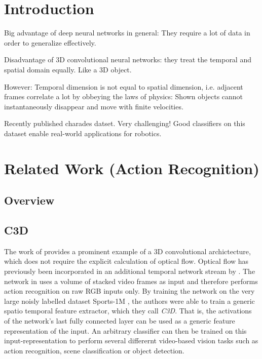 \section{Introduction}

Big advantage of deep neural networks in general: They require a lot of data in order to generalize effectively.

Disadvantage of 3D convolutional neural networks: they treat the temporal and spatial domain equally.
Like a 3D object.

However: Temporal dimension is not equal to spatial dimension, i.e. adjacent frames correlate a lot by obbeying the laws of physics: Shown objects cannot instantaneously disappear and move with finite velocities.

Recently published charades datset. Very challenging!
Good classifiers on this dataset enable real-world applications for robotics.

\section{Related Work (Action Recognition)}

\subsection{Overview}

\subsection{C3D}
The work of \textcite{tran_learning_2015} provides a prominent example of a 3D convolutional archictecture, which does not require the explicit calculation of optical flow.
Optical flow has previously been incorporated in an additional temporal network stream by \textcite{simonyan_two-stream_2014}.
The network in \cite{tran_learning_2015} uses a volume of stacked video frames as input and therefore performs action recognition on raw RGB inputs only.
By training the network on the very large noisly labelled dataset Sports-1M \cite{karpathy_large-scale_2014}, the authors were able to train a generic spatio temporal feature extractor, which they call \textit{C3D}.
That is, the activations of the network's last fully connected layer can be used as a generic feature representation of the input.
An arbitrary classifier can then be trained on this input-representation to perform several differernt video-based vision tasks such as action recognition, scene classification or object detection.

